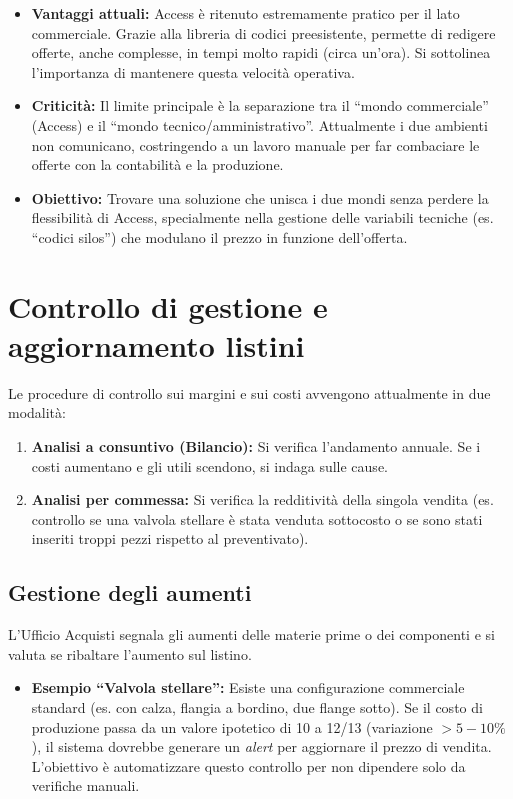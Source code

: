 \documentclass[12pt, a4paper]{article} %
\begin{document}
\begin{itemize}
    \item \textbf{Vantaggi attuali:} Access è ritenuto estremamente pratico per il lato commerciale. Grazie alla libreria di codici preesistente, permette di redigere offerte, anche complesse, in tempi molto rapidi (circa un'ora). Si sottolinea l'importanza di mantenere questa velocità operativa.
    \item \textbf{Criticità:} Il limite principale è la separazione tra il ``mondo commerciale'' (Access) e il ``mondo tecnico/amministrativo''. Attualmente i due ambienti non comunicano, costringendo a un lavoro manuale per far combaciare le offerte con la contabilità e la produzione.
    \item \textbf{Obiettivo:} Trovare una soluzione che unisca i due mondi senza perdere la flessibilità di Access, specialmente nella gestione delle variabili tecniche (es. ``codici silos'') che modulano il prezzo in funzione dell'offerta.
\end{itemize}

\section{Controllo di gestione e aggiornamento listini}
Le procedure di controllo sui margini e sui costi avvengono attualmente in due modalità:
\begin{enumerate}
    \item \textbf{Analisi a consuntivo (Bilancio):} Si verifica l'andamento annuale. Se i costi aumentano e gli utili scendono, si indaga sulle cause.
    \item \textbf{Analisi per commessa:} Si verifica la redditività della singola vendita (es. controllo se una valvola stellare è stata venduta sottocosto o se sono stati inseriti troppi pezzi rispetto al preventivato).
\end{enumerate}

\subsection*{Gestione degli aumenti}
L'Ufficio Acquisti segnala gli aumenti delle materie prime o dei componenti e si valuta se ribaltare l'aumento sul listino.
\begin{itemize}
    \item \textbf{Esempio ``Valvola stellare'':} Esiste una configurazione commerciale standard (es. con calza, flangia a bordino, due flange sotto). Se il costo di produzione passa da un valore ipotetico di 10 a 12/13 (variazione $> 5-10\%$), il sistema dovrebbe generare un \textit{alert} per aggiornare il prezzo di vendita. L'obiettivo è automatizzare questo controllo per non dipendere solo da verifiche manuali.
\end{itemize}
\end{document}
